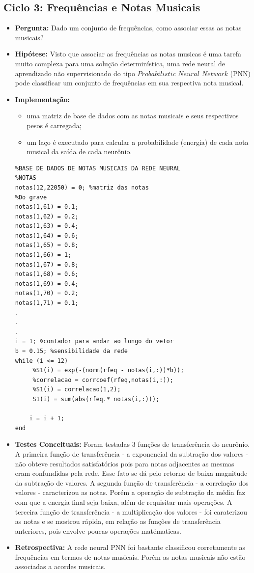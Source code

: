 \subsection{Ciclo 3: Frequências e Notas Musicais}
\label{subsec:ciclo_3}
\begin{itemize}
\item \textbf{Pergunta:} Dado um conjunto de frequências, como associar essas as notas musicais?
\item \textbf{Hipótese:} Visto que associar as frequências as notas musicas é uma tarefa muito complexa para uma solução determinística, uma rede neural de aprendizado não supervisionado do tipo $Probabilistic$ $Neural$ $Network$ (PNN) pode classificar um conjunto de frequências em sua respectiva nota musical.
\item \textbf{Implementação:}
\begin{itemize} 
	\item uma matriz de base de dados com as notas musicais e seus respectivos pesos é carregada;
	\item um laço é executado para calcular a probabilidade (energia) de cada nota musical da saída de cada neurônio.
\end{itemize} 
\begin{lstlisting}
%BASE DE DADOS DE NOTAS MUSICAIS DA REDE NEURAL
%NOTAS
notas(12,22050) = 0; %matriz das notas
%Do grave
notas(1,61) = 0.1;
notas(1,62) = 0.2;
notas(1,63) = 0.4;
notas(1,64) = 0.6;
notas(1,65) = 0.8;
notas(1,66) = 1;
notas(1,67) = 0.8;
notas(1,68) = 0.6;
notas(1,69) = 0.4;
notas(1,70) = 0.2;
notas(1,71) = 0.1;
.
.
.
i = 1; %contador para andar ao longo do vetor
b = 0.15; %sensibilidade da rede
while (i <= 12)
     %S1(i) = exp(-(norm(rfeq - notas(i,:))*b));
     %correlacao = corrcoef(rfeq,notas(i,:));
     %S1(i) = correlacao(1,2);    
     S1(i) = sum(abs(rfeq.* notas(i,:)));

    i = i + 1;
end

\end{lstlisting}
\item \textbf{Testes Conceituais:} Foram testadas 3 funções de transferência do neurônio. A primeira função de transferência - a exponencial da subtração dos valores - não obteve resultados satisfatórios pois para notas adjacentes as mesmas eram confundidas pela rede. Esse fato se dá pelo retorno de baixa magnitude da subtração de valores. A segunda função de transferência - a correlação dos valores - caracterizou as notas. Porém a operação de subtração da média faz com que a energia final seja baixa, além de requisitar mais operações. A terceira função de transferência - a multiplicação dos valores - foi caraterizou as notas e se mostrou rápida, em relação as funções de transferência anteriores, pois envolve poucas operações matématicas.
\item \textbf{Retrospectiva:} A rede neural PNN foi bastante classificou corretamente as frequências em termos de notas musicais. Porém as notas musicais não estão associadas a acordes musicais.
\end{itemize}

